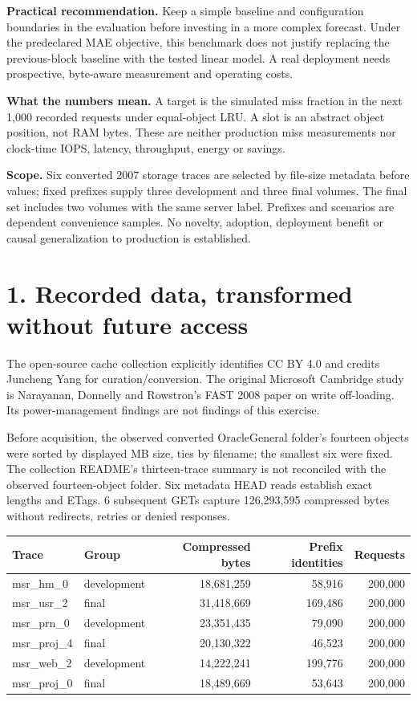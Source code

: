 \documentclass[11pt]{article}
\newcommand{\MSourceObjects}{6}
\newcommand{\MSourceBytes}{126,293,595}
\newcommand{\MTraceABytes}{18,681,259}
\newcommand{\MTraceADistinct}{58,916}
\newcommand{\MTraceARecords}{200,000}
\newcommand{\MTraceBBytes}{31,418,669}
\newcommand{\MTraceBDistinct}{169,486}
\newcommand{\MTraceBRecords}{200,000}
\newcommand{\MTraceCBytes}{23,351,435}
\newcommand{\MTraceCDistinct}{79,090}
\newcommand{\MTraceCRecords}{200,000}
\newcommand{\MTraceDBytes}{20,130,322}
\newcommand{\MTraceDDistinct}{46,523}
\newcommand{\MTraceDRecords}{200,000}
\newcommand{\MTraceEBytes}{14,222,241}
\newcommand{\MTraceEDistinct}{199,776}
\newcommand{\MTraceERecords}{200,000}
\newcommand{\MTraceFBytes}{18,489,669}
\newcommand{\MTraceFDistinct}{53,643}
\newcommand{\MTraceFRecords}{200,000}
\begin{document}
\textbf{Practical recommendation.} Keep a simple baseline and configuration boundaries in the evaluation before investing in a more complex forecast. Under the predeclared MAE objective, this benchmark does not justify replacing the previous-block baseline with the tested linear model. A real deployment needs prospective, byte-aware measurement and operating costs.

\textbf{What the numbers mean.} A target is the simulated miss fraction in the next 1,000 recorded requests under equal-object LRU. A slot is an abstract object position, not RAM bytes. These are neither production miss measurements nor clock-time IOPS, latency, throughput, energy or savings.

\textbf{Scope.} Six converted 2007 storage traces are selected by file-size metadata before values; fixed prefixes supply three development and three final volumes. The final set includes two volumes with the same server label. Prefixes and scenarios are dependent convenience samples. No novelty, adoption, deployment benefit or causal generalization to production is established.
\newpage
\section*{1. Recorded data, transformed without future access}
The open-source cache collection explicitly identifies CC BY 4.0 and credits Juncheng Yang for curation/conversion. The original Microsoft Cambridge study is Narayanan, Donnelly and Rowstron's FAST 2008 paper on write off-loading. Its power-management findings are not findings of this exercise.

Before acquisition, the observed converted OracleGeneral folder's fourteen objects were sorted by displayed MB size, ties by filename; the smallest six were fixed. The collection README's thirteen-trace summary is not reconciled with the observed fourteen-object folder. Six metadata HEAD reads establish exact lengths and ETags. \MSourceObjects{} subsequent GETs capture \MSourceBytes{} compressed bytes without redirects, retries or denied responses.

\begin{center}\small\begin{tabular}{llrrr}\toprule
Trace & Group & Compressed bytes & Prefix identities & Requests\\\midrule
msr\_hm\_0 & development & \MTraceABytes & \MTraceADistinct & \MTraceARecords \\
msr\_usr\_2 & final & \MTraceBBytes & \MTraceBDistinct & \MTraceBRecords \\
msr\_prn\_0 & development & \MTraceCBytes & \MTraceCDistinct & \MTraceCRecords \\
msr\_proj\_4 & final & \MTraceDBytes & \MTraceDDistinct & \MTraceDRecords \\
msr\_web\_2 & development & \MTraceEBytes & \MTraceEDistinct & \MTraceERecords \\
msr\_proj\_0 & final & \MTraceFBytes & \MTraceFDistinct & \MTraceFRecords \\
\bottomrule\end{tabular}\end{center}
\end{document}
